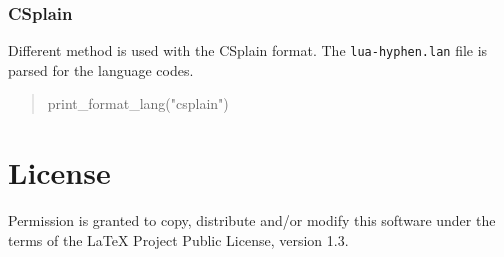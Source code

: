 \documentclass[12pt]{ltxdoc}
\begin{document}
\subsubsection{CSplain}

Different method is used with the CSplain format. The \verb|lua-hyphen.lan| file is parsed for the language codes.

\begin{quotation}
  \small\noindent
  \begin{luacode*}
    print_format_lang("csplain")
  \end{luacode*}
\end{quotation}


\section{License}

Permission is granted to copy, distribute and/or modify this software
under the terms of the LaTeX Project Public License, version 1.3.
\end{document}

